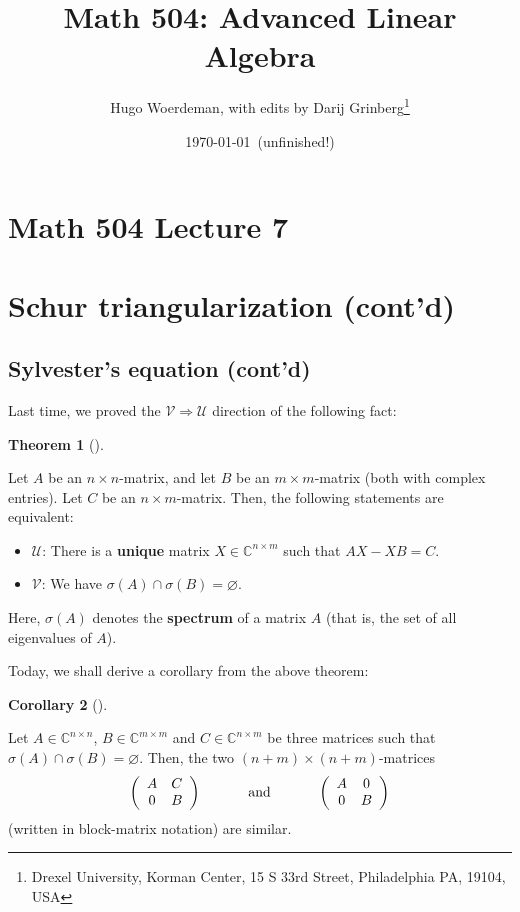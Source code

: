 \documentclass[numbers=enddot,12pt,final,onecolumn,notitlepage]{scrartcl}%
\numberwithin{exer}{subsection}
\theoremstyle{definition}
\newtheorem{theo}{Theorem}[subsection]
\newenvironment{theorem}[1][]
{\begin{theo}[#1]\begin{leftbar}}
{\end{leftbar}\end{theo}}
\newtheorem{coro}[theo]{Corollary}
\newenvironment{corollary}[1][]
{\begin{coro}[#1]\begin{leftbar}}
{\end{leftbar}\end{coro}}
\begin{document}
\title{Math 504: Advanced Linear Algebra}
\author{Hugo Woerdeman, with edits by Darij Grinberg\thanks{Drexel University, Korman
Center, 15 S 33rd Street, Philadelphia PA, 19104, USA}}
\date{\today\ (unfinished!)}
\maketitle
\tableofcontents

\section*{Math 504 Lecture 7}

\section{Schur triangularization (cont'd)}

\subsection{Sylvester's equation (cont'd)}

Last time, we proved the $\mathcal{V}\Longrightarrow\mathcal{U}$ direction of
the following fact:

\begin{theorem}
Let $A$ be an $n\times n$-matrix, and let $B$ be an $m\times m$-matrix (both
with complex entries). Let $C$ be an $n\times m$-matrix. Then, the following
statements are equivalent:

\begin{itemize}
\item $\mathcal{U}$: There is a \textbf{unique} matrix $X\in\mathbb{C}%
^{n\times m}$ such that $AX-XB=C$.

\item $\mathcal{V}$: We have $\sigma\left(  A\right)  \cap\sigma\left(
B\right)  =\varnothing$.
\end{itemize}
\end{theorem}

Here, $\sigma\left(  A\right)  $ denotes the \textbf{spectrum} of a matrix $A$
(that is, the set of all eigenvalues of $A$).

Today, we shall derive a corollary from the above theorem:

\begin{corollary}
Let $A\in\mathbb{C}^{n\times n}$, $B\in\mathbb{C}^{m\times m}$ and
$C\in\mathbb{C}^{n\times m}$ be three matrices such that $\sigma\left(
A\right)  \cap\sigma\left(  B\right)  =\varnothing$. Then, the two $\left(
n+m\right)  \times\left(  n+m\right)  $-matrices%
\[
\left(
\begin{array}
[c]{cc}%
A & C\\
0 & B
\end{array}
\right)  \ \ \ \ \ \ \ \ \ \ \text{and}\ \ \ \ \ \ \ \ \ \ \left(
\begin{array}
[c]{cc}%
A & 0\\
0 & B
\end{array}
\right)
\]
(written in block-matrix notation) are similar.
\end{corollary}
\end{document}
